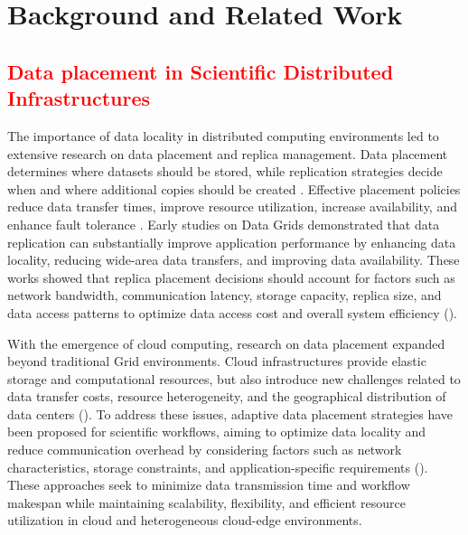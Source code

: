 \documentclass[a4paper,fleqn]{cas-dc}
\begin{document}
\section{Background and Related Work}


\subsection*{\textcolor{red}{Data placement in Scientific Distributed Infrastructures}}

The importance of data locality in distributed computing environments led to extensive research on data placement and replica management. Data placement determines where datasets should be stored, while replication strategies decide when and where additional copies should be created \citealp{10212287}. Effective placement policies reduce data transfer times, improve resource utilization, increase availability, and enhance fault tolerance \cite{10763884}. Early studies on Data Grids demonstrated that data replication can substantially improve application performance by enhancing data locality, reducing wide-area data transfers, and improving data availability. These works showed that replica placement decisions should account for factors such as network bandwidth, communication latency, storage capacity, replica size, and data access patterns to optimize data access cost and overall system efficiency
(\citealp{chervenak2000data, stockinger2002file, ranganathan2001identifying, lamehamedi2002data}).

With the emergence of cloud computing, research on data placement expanded beyond traditional Grid environments. Cloud infrastructures provide elastic storage and computational resources, but also introduce new challenges related to data transfer costs, resource heterogeneity, and the geographical distribution of data centers (\citealp{kim2018adaptive, sabaghian2023data}). To address these issues, adaptive data placement strategies have been proposed for scientific workflows, aiming to optimize data locality and reduce communication overhead by considering factors such as network characteristics, storage constraints, and application-specific requirements (\citealp{lin2019time}). These approaches seek to minimize data transmission time and workflow makespan while maintaining scalability, flexibility, and efficient resource utilization in cloud and heterogeneous cloud-edge environments.
\end{document}
